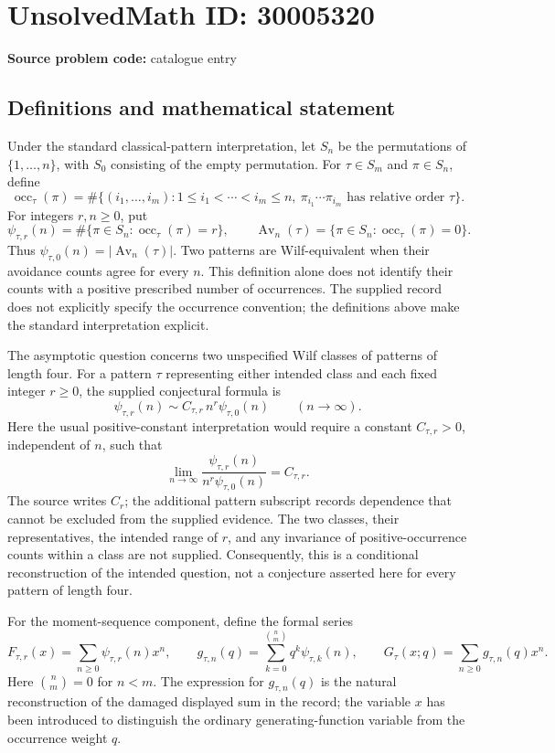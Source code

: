 \documentclass[11pt]{article}
\begin{document}
\section*{UnsolvedMath ID: 30005320}
\textbf{Source problem code:} catalogue entry
\subsection{Definitions and mathematical statement}
Under the standard classical-pattern interpretation, let \(S_n\) be the permutations of \(\{1,\ldots,n\}\), with \(S_0\) consisting of the empty permutation. For \(\tau\in S_m\) and \(\pi\in S_n\), define
\[
\operatorname{occ}_{\tau}(\pi)=\#\{(i_1,\ldots,i_m):1\le i_1<\cdots<i_m\le n,\ \pi_{i_1}\cdots\pi_{i_m}\text{ has relative order }\tau\}.
\]
For integers \(r,n\ge0\), put
\[
\psi_{\tau,r}(n)=\#\{\pi\in S_n:\operatorname{occ}_{\tau}(\pi)=r\},
\qquad
\operatorname{Av}_n(\tau)=\{\pi\in S_n:\operatorname{occ}_{\tau}(\pi)=0\}.
\]
Thus \(\psi_{\tau,0}(n)=|\operatorname{Av}_n(\tau)|\). Two patterns are Wilf-equivalent when their avoidance counts agree for every \(n\). This definition alone does not identify their counts with a positive prescribed number of occurrences. The supplied record does not explicitly specify the occurrence convention; the definitions above make the standard interpretation explicit.

The asymptotic question concerns two unspecified Wilf classes of patterns of length four. For a pattern \(\tau\) representing either intended class and each fixed integer \(r\ge0\), the supplied conjectural formula is
\[
\psi_{\tau,r}(n)\sim C_{\tau,r}\,n^r\psi_{\tau,0}(n)
\qquad(n\to\infty).
\]
Here the usual positive-constant interpretation would require a constant \(C_{\tau,r}>0\), independent of \(n\), such that
\[
\lim_{n\to\infty}\frac{\psi_{\tau,r}(n)}{n^r\psi_{\tau,0}(n)}=C_{\tau,r}.
\]
The source writes \(C_r\); the additional pattern subscript records dependence that cannot be excluded from the supplied evidence. The two classes, their representatives, the intended range of \(r\), and any invariance of positive-occurrence counts within a class are not supplied. Consequently, this is a conditional reconstruction of the intended question, not a conjecture asserted here for every pattern of length four.

For the moment-sequence component, define the formal series
\[
F_{\tau,r}(x)=\sum_{n\ge0}\psi_{\tau,r}(n)x^n,
\qquad
g_{\tau,n}(q)=\sum_{k=0}^{\binom{n}{m}}q^k\psi_{\tau,k}(n),
\qquad
G_{\tau}(x;q)=\sum_{n\ge0}g_{\tau,n}(q)x^n.
\]
Here \(\binom{n}{m}=0\) for \(n<m\). The expression for \(g_{\tau,n}(q)\) is the natural reconstruction of the damaged displayed sum in the record; the variable \(x\) has been introduced to distinguish the ordinary generating-function variable from the occurrence weight \(q\).
\end{document}
